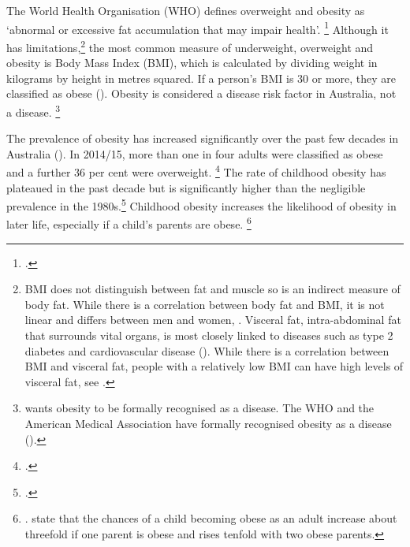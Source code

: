 \documentclass[embargoed]{grattan}
\begin{document}
The World Health Organisation (WHO) defines overweight and obesity as `abnormal or excessive fat accumulation that may impair health'.%
\footcite{Organization2016ObesityoverweightFact} Although it has limitations,\footnote{BMI does not distinguish between fat and muscle so is an indirect measure of body fat.
While there is a correlation between body fat and BMI, it is not linear and differs between men and women, \textcite{Rothman2008BMIrelatederrors}.
Visceral fat, intra-abdominal fat that surrounds vital organs, is most closely linked to diseases such as type 2 diabetes and cardiovascular disease (\textcites{Mathieu2009Visceralobesitylink}{Despres2012Bodyfatdistribution}{Janiszewski2012WhyBodyMass}).
While there is a correlation between BMI and visceral fat, people with a relatively low BMI can have high levels of visceral fat, see \textcite{Rankinen1999predictionabdominalvisceral}.} 
the most common measure of underweight, overweight and obesity is Body Mass Index (BMI), which is calculated by dividing weight in kilograms by height in metres squared.
If a person's BMI is 30 or more, they are classified as obese ().
Obesity is considered a disease risk factor in Australia, not a disease.%
\footnote{\textcite{Australia2014NoTimeWeight} wants obesity to be formally recognised as a disease.
The WHO and the American Medical Association have formally recognised obesity as a disease (\textcites{Organisation2000Obesitypreventingmanaging}{Stoner2014DidAmericanMedical}{Australia2015NoTimeWeight}).}



The prevalence of obesity has increased significantly over the past few decades in Australia ().
In 2014/15, more than one in four adults were classified as obese and a further 36 per cent were overweight.%
\footcite[][Table 8.1]{ABS20154364055001NationalHealth} The rate of childhood obesity has plateaued in the past decade but is significantly higher than the negligible prevalence in the 1980s.\footcites{Hardy2010NSWSchoolsPhysical}{Booth2003obesity}
Childhood obesity increases the likelihood of obesity in later life, especially if a child's parents are obese.%
\footnote{\textcites{Health2013AustralianDietaryGuidelines}{Baker2007Childhoodbodymass}{Popkin2004nutritiontransitionworldwide}{Summerbell2005Interventionspreventingobesity}. \textcite{Sobko2011randomisedcontrolledtrial} state that the chances of a child becoming obese as an adult increase about threefold if one parent is obese and rises tenfold with two obese parents.}
\end{document}
